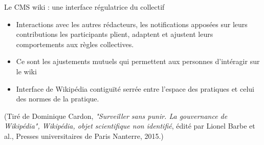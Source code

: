 \begin{frame}{Le CMS wiki : une interface régulatrice du collectif}
\begin{itemize}
    \item Interactions avec les autres rédacteurs, les notifications apposées sur leurs contributions \textrightarrow{} les participants plient, adaptent et ajustent leurs comportements aux règles collectives.
    \item Ce sont les ajustements mutuels qui permettent aux personnes d'intéragir sur le wiki
    \item Interface de Wikipédia \textrightarrow{} contiguïté serrée entre l'espace des pratiques et celui des normes de la pratique.
\end{itemize} 
(Tiré de Dominique Cardon, \textit{"Surveiller sans punir. La gouvernance de Wikipédia", Wikipédia, objet scientifique non identifié}, édité par Lionel Barbe et al., Presses universitaires de Paris Nanterre, 2015.)
\end{frame}

